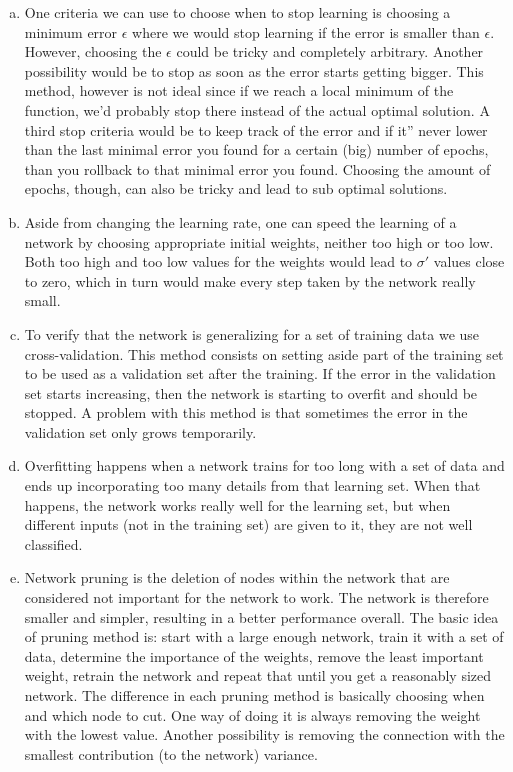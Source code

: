 \documentclass{article}
\begin{document}
\begin{enumerate}[a)]
\item One criteria we can use to choose when to stop learning is choosing a minimum error $\epsilon$ where we would stop learning if the error is smaller than 
$\epsilon$. However, choosing the $\epsilon$ could be tricky and completely arbitrary. Another possibility would be to stop as soon as the error starts getting bigger. This method, however is not ideal since if we reach a local minimum of the function, we'd probably stop there instead of the actual optimal solution. A third stop criteria would be to keep track of the error and if it'' never lower than the last minimal error you found for a certain (big) number of epochs, than you rollback to that minimal error you found. Choosing the amount of epochs, though, can also be tricky and lead to sub optimal solutions.

\item Aside from changing the learning rate, one can speed the learning of a network by choosing appropriate initial weights, neither too high or too low. Both too high and too low values for the weights would lead to $\sigma'$ values close to zero, which in turn would make every step taken by the network really small.

\item  To verify that the network is generalizing for a set of training data we use cross-validation. This method consists on setting aside part of the training set to be used as a validation set after the training. If the error in the validation set starts increasing, then the network is starting to overfit and should be stopped. A problem with this method is that sometimes the error in the validation set only grows temporarily.

\item Overfitting happens when a network trains for too long with a set of data and ends up incorporating too many details from that learning set. When that happens, the network works really well for the learning set, but when different inputs (not in the training set) are given to it, they are not well classified.

\item Network pruning is the deletion of nodes within the network that are considered not important for the network to work. The network is therefore smaller and simpler, resulting in a better performance overall. The basic idea of pruning method is: start with a large enough network, train it with a set of data, determine the importance of the weights, remove the least important weight, retrain the network and repeat that until you get a reasonably sized network. The difference in each pruning method is basically choosing when and which node to cut. One way of doing it is always removing the weight with the lowest value. Another possibility is removing the connection with the smallest contribution (to the network) variance.
    
\end{enumerate}
\end{document}
